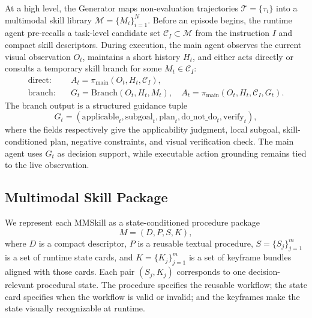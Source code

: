 \documentclass{llmxive}
\begin{document}
At a high level, the Generator maps non-evaluation trajectories $\mathcal{T}=\{\tau_i\}$ into a multimodal skill library $\mathcal{M}=\{M_i\}_{i=1}^{N}$. Before an episode begins, the runtime agent pre-recalls a task-level candidate set $\mathcal{C}_I \subset \mathcal{M}$ from the instruction $I$ and compact skill descriptors. During execution, the main agent observes the current visual observation $O_t$, maintains a short history $H_t$, and either acts directly or consults a temporary skill branch for some $M_t\in\mathcal{C}_I$:
\begin{equation}
\begin{aligned}
\text{direct}: \quad
    & A_t = \pi_{\text{main}}(O_t,H_t,\mathcal{C}_I),\\
\text{branch}: \quad
    & G_t = \text{Branch}(O_t,H_t,M_t),\quad
      A_t = \pi_{\text{main}}(O_t,H_t,\mathcal{C}_I,G_t).
\end{aligned}
\label{eq:runtime-modes}
\end{equation}
The branch output is a structured guidance tuple
\begin{equation}
    G_t = (\text{applicable}_t,\text{subgoal}_t,\text{plan}_t,\text{do\_not\_do}_t,\text{verify}_t),
    \label{eq:branch-summary}
\end{equation}
where the fields respectively give the applicability judgment, local subgoal, skill-conditioned plan, negative constraints, and visual verification check. The main agent uses $G_t$ as decision support, while executable action grounding remains tied to the live observation.

\subsection{Multimodal Skill Package}
\label{sec:method-package}

We represent each MMSkill as a state-conditioned procedure package
\begin{equation}
    M=(D,P,S,K),
    \label{eq:mmskill}
\end{equation}
where $D$ is a compact descriptor, $P$ is a reusable textual procedure, $S=\{S_j\}_{j=1}^{m}$ is a set of runtime state cards, and $K=\{K_j\}_{j=1}^{m}$ is a set of keyframe bundles aligned with those cards. Each pair $(S_j,K_j)$ corresponds to one decision-relevant procedural state. The procedure specifies the reusable workflow; the state card specifies when the workflow is valid or invalid; and the keyframes make the state visually recognizable at runtime.
\end{document}
